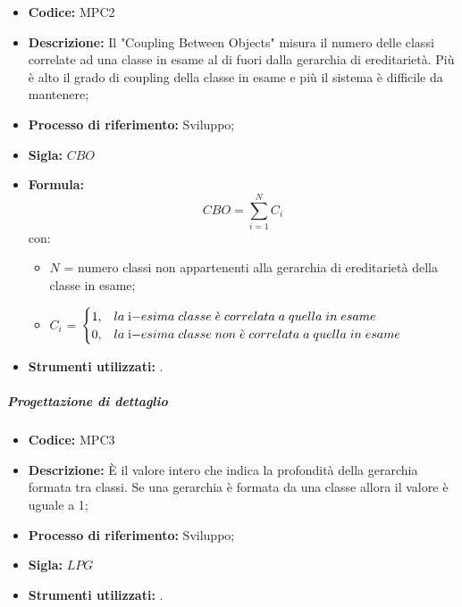     \begin{itemize}
        \item \textbf{Codice:} MPC2
        \item \textbf{Descrizione:} Il "Coupling Between Objects" misura il numero delle classi correlate ad una classe in esame al di fuori dalla gerarchia di ereditarietà. Più è alto il grado di coupling della classe in esame e più il sistema è difficile da mantenere;
        \item \textbf{Processo di riferimento:} Sviluppo;
        \item \textbf{Sigla:} $CBO$
        \item \textbf{Formula:} $$CBO = {\sum_{i=1}^{N} C_i}$$
        con:
        \begin{itemize}
            \item $N$ = numero classi non appartenenti alla gerarchia di ereditarietà della classe in esame;
            \item $C_i$ =
            \begin{math} {
                \begin{cases}
                    1, & la \; $i$-esima \; classe \; \grave{e} \; correlata \; a \; quella \; in \; esame \\
                    0, & la \; $i$-esima \; classe \; non \; \grave{e} \; correlata \; a \; quella \; in \; esame
                \end{cases}
            }
            \end{math}
        \end{itemize}
        \item \textbf{Strumenti utilizzati:} .
    \end{itemize}
\subparagraph{Progettazione di dettaglio}
    

    \begin{itemize}
        \item \textbf{Codice:} MPC3
        \item \textbf{Descrizione:} È il valore intero che indica la profondità della gerarchia formata tra classi. Se una gerarchia è formata da una classe allora il valore è uguale a 1;
        \item \textbf{Processo di riferimento:} Sviluppo;
        \item \textbf{Sigla:} $LPG$
        \item \textbf{Strumenti utilizzati:} .
    \end{itemize}

